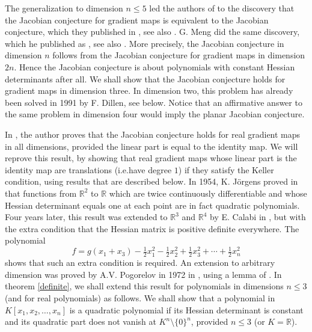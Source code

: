 \documentclass[10pt]{article}
\theoremstyle{remark}
\theoremstyle{definition}
\newcommand{\R}{{\mathbb R}}
\begin{document}
The generalization to dimension $n \le 5$ led the authors of \cite{MR2110519} to the discovery
that the Jacobian conjecture for gradient maps is equivalent to the Jacobian conjecture, 
which they published in \cite{MR2138860}, see also \cite[Cor.\@ 1.4]{MR3179983}. 
G. Meng did the same discovery, which he published as \cite[Prop.\@ 1.4]{MR2221506}, see also
\cite[Th.\@ 1.2]{MR3179983}.
More precisely, the Jacobian conjecture in dimension $n$ follows from the Jacobian conjecture for 
gradient maps in dimension $2n$. Hence the Jacobian conjecture is about polynomials with constant 
Hessian determinants after all. We shall show that the Jacobian conjecture holds for gradient maps 
in dimension three. In dimension two, this problem has already been solved in 1991 by F. Dillen,
see below. Notice that an affirmative answer to the same problem in dimension four would imply the 
planar Jacobian conjecture.

In \cite[Th.\@ 1.3]{MR2221506}, the author proves that the Jacobian conjecture holds for real gradient 
maps in all dimensions, provided the linear part is equal to the identity map. We will reprove
this result, by showing that real gradient maps whose linear part is the identity map are 
translations (i.e.\@ have degree $1$) if they satisfy the Keller condition, using results that are 
described below. 
In 1954, K. J{\"o}rgens proved in \cite{MR0062326} that functions from $\R^2$ to $\R$ which are 
twice continuously differentiable and whose Hessian determinant equals one at each point are in fact 
quadratic polynomials. Four years later, this result was extended to $\R^3$ and $\R^4$ by E. Calabi in 
\cite{MR0106487}, but with the extra condition that the Hessian matrix is positive definite 
everywhere. The polynomial 
$$
f = g(x_1 + x_3) - \tfrac12 x_1^2 - \tfrac12 x_2^2 + \tfrac12 x_3^2 + \cdots + \tfrac12 x_n^2 
$$
shows that such an extra condition is required. An extension to arbitrary dimension was proved by A.V. 
Pogorelov in 1972 in \cite{MR0319126}, using a lemma of \cite{MR0106487}. In theorem \ref{definite}, we 
shall extend this result for polynomials in dimensions $n \le 3$ (and for real polynomials) as follows. 
We shall show that a polynomial in $K[x_1,x_2,\ldots,x_n]$ is a quadratic polynomial if its Hessian 
determinant is constant and its quadratic part does not vanish at $K^n \setminus \{0\}^n$,
provided $n \le 3$ (or $K = \R$). 
\end{document}

